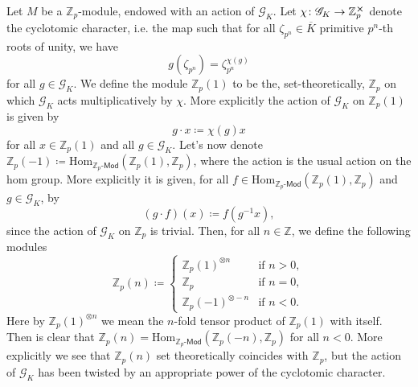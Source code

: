 \begin{ntt}[]
	Let $M$ be a $\mathbb{Z}_{p}$-module, endowed with an action of $\mathscr{G}_K$.
	Let $\chi\colon \mathscr{G}_K \to \mathbb{Z}_{p}^{\cross}$ denote the cyclotomic character,
	i.e. the map such that for all $\zeta_{p^n} \in \overline{K}$ primitive $p^n$-th roots of unity,
	we have
	\begin{equation*}
		g(\zeta_{p^n}) = \zeta_{p^n}^{\chi(g)}
	\end{equation*}
	for all $g \in \mathscr{G}_K$.
	We define the module $\mathbb{Z}_{p}(1)$ to be the, set-theoretically, $\mathbb{Z}_{p}$
	on which $\mathscr{G}_K$ acts multiplicatively by $\chi$.
	More explicitly the action of $\mathscr{G}_K$ on $\mathbb{Z}_{p}(1)$ is given by
	\begin{equation*}
		g \cdot x \coloneqq \chi(g) x
	\end{equation*}
	for all $x \in \mathbb{Z}_{p}(1)$ and all $g \in \mathscr{G}_K$.
	Let's now denote $\mathbb{Z}_{p}(-1) \coloneqq \mathrm{Hom}_{ \mathbb{Z}_{p}\text{-}\mathsf{Mod} }
	\left( \mathbb{Z}_{p}(1), \mathbb{Z}_{p} \right)$, where the action is the usual action on the
	hom group.
	More explicitly it is given, for all $f \in \mathrm{Hom}_{ \mathbb{Z}_{p}\text{-}\mathsf{Mod} }
	\left( \mathbb{Z}_{p}(1), \mathbb{Z}_{p} \right)$ and $g \in \mathscr{G}_K$, by
	\begin{equation*}
		(g \cdot f)(x) \coloneqq f (g^{-1} x)
	,\end{equation*}
	since the action of $\mathscr{G}_K$ on $\mathbb{Z}_{p}$ is trivial.
	Then, for all $n \in \mathbb{Z}$, we define the following modules
	\begin{equation*}
		\mathbb{Z}_{p}(n) \coloneqq
		\begin{cases}
			\mathbb{Z}_{p}(1)^{\otimes n} & \text{if } n > 0,\\
			\mathbb{Z}_{p} & \text{if } n = 0,\\
			\mathbb{Z}_{p}(-1)^{\otimes -n} & \text{if } n < 0.
		\end{cases} 
	\end{equation*}
	Here by $\mathbb{Z}_{p}(1)^{\otimes n}$ we mean the $n$-fold tensor product
	of $\mathbb{Z}_{p}(1)$ with itself.
	Then is clear that $\mathbb{Z}_{p}(n) = \mathrm{Hom}_{ \mathbb{Z}_{p}\text{-}\mathsf{Mod} }
	\left( \mathbb{Z}_{p}(-n), \mathbb{Z}_{p} \right)$ for all $n < 0$.
	More explicitly we see that $\mathbb{Z}_{p}(n)$ set theoretically coincides
	with $\mathbb{Z}_{p}$, but the action of $\mathscr{G}_K$ has been twisted by
	an appropriate power of the cyclotomic character.

\end{ntt}
